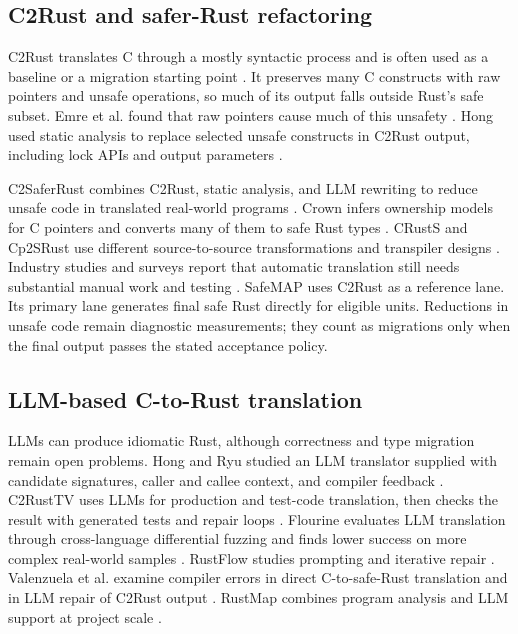 \documentclass[conference]{IEEEtran}
\newcommand{\tool}{SafeMAP\xspace}
\begin{document}
\subsection{C2Rust and safer-Rust refactoring}

C2Rust translates C through a mostly syntactic process and is often used as a
baseline or a migration starting point \cite{c2rust}. It preserves many C
constructs with raw pointers and unsafe operations, so much of its output falls
outside Rust's safe subset. Emre et al. found that raw pointers cause much of
this unsafety \cite{emre2021safer}. Hong used static analysis to replace
selected unsafe constructs in C2Rust output, including lock APIs and output
parameters \cite{hong2023static}.

C2SaferRust combines C2Rust, static analysis, and LLM rewriting to reduce unsafe
code in translated real-world programs \cite{nitin2026c2saferrust}. Crown
infers ownership models for C pointers and converts many of them to safe Rust
types \cite{zhang2023ownership}. CRustS and Cp2SRust use different
source-to-source transformations and transpiler designs
\cite{ling2022trust,mohapatra2026cp2srust}. Industry studies and surveys report
that automatic translation still needs substantial manual work and testing
\cite{hong2025cacm,viirola2026feasible}. \tool uses C2Rust as a reference lane.
Its primary lane generates final safe Rust directly for eligible units.
Reductions in unsafe code remain diagnostic measurements; they count as
migrations only when the final output passes the stated acceptance policy.

\subsection{LLM-based C-to-Rust translation}

LLMs can produce idiomatic Rust, although correctness and type migration remain
open problems. Hong and Ryu studied an LLM translator supplied with candidate
signatures, caller and callee context, and compiler feedback
\cite{hong2025typemigrating}. C2RustTV uses LLMs for production and test-code
translation, then checks the result with generated tests and repair loops
\cite{zhou2025c2rusttv}. Flourine evaluates LLM translation through
cross-language differential fuzzing and finds lower success on more complex
real-world samples \cite{eniser2025fluorine}. RustFlow studies prompting and
iterative repair \cite{zhang2026rustflow}. Valenzuela et al. examine compiler
errors in direct C-to-safe-Rust translation and in LLM repair of C2Rust output
\cite{valenzuela2026llmcompile}. RustMap combines program analysis and LLM
support at project scale \cite{cai2025rustmap}.
\end{document}
